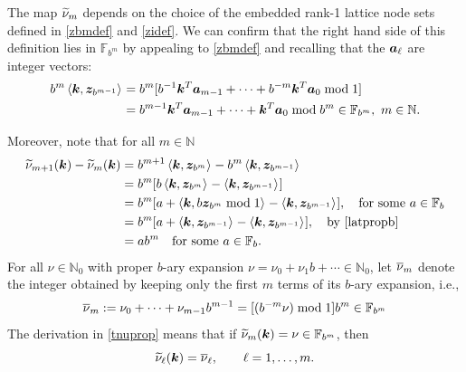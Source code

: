 \documentclass[graybox]{svmult}
\newcommand{\N}{\mathbb{N}} %
\newcommand{\F}{\mathbb{F}} %
\newcommand{\bsz}{\boldsymbol{z}}    %
\begin{document}
The map $\widetilde{\nu}_m$ depends on the choice of the embedded rank-1 lattice node sets defined in \eqref{zbmdef} and \eqref{zidef}.  We can confirm that the right hand side of this definition lies in $\F_{b^m}$ by appealing to  \eqref{zbmdef} and recalling that the $\boldsymbol{a}_\ell$ are integer vectors:
\begin{align*}
b^{m} \ip{\bsk}{\bsz_{b^{m-1}}} &= b^m[b^{-1} \bsk^T\bsa_{m-1} + \cdots + b^{-m}\bsk^T \bsa_{0} \bmod 1]\\
&= b^{m-1} \bsk^T\bsa_{m-1} + \cdots + \bsk^T \bsa_{0} \bmod b^m \in \F_{b^m}, \ m \in \N.
\end{align*}

Moreover, note that for all $m\in \N$
\begin{align}
\label{tnuprop}
\nonumber
\tnu_{m+1}(\bsk) - \tnu_{m}(\bsk) & = b^{m+1} \ip{\bsk}{\bsz_{b^{m}}} - b^{m} \ip{\bsk}{\bsz_{b^{m-1}}} \\
\nonumber
&=b^{m}[ b\ip{\bsk}{\bsz_{b^{m}}} - \ip{\bsk}{\bsz_{b^{m-1}}}]\\
\nonumber
&=b^{m}[ a + \ip{\bsk}{b\bsz_{b^{m}} \bmod 1}  - \ip{\bsk}{\bsz_{b^{m-1}}}], \quad \text{for some }a \in \F_b \\
\nonumber
&=b^{m}[ a + \ip{\bsk}{\bsz_{b^{m-1}}}  - \ip{\bsk}{\bsz_{b^{m-1}}}], \quad  \text{by \eqref{latpropb}} \\
&=a b^{m} \quad \text{for some }a \in \F_b.
\end{align}
For all $\nu\in \N_0$ with proper $b$-ary expansion $\nu= \nu_0 + \nu_1 b + \cdots \in \N_0$, let $\overline{\nu}_{m}$ denote the integer obtained by keeping only the first $m$ terms of its $b$-ary expansion, i.e., 
\begin{equation}
\label{onudef}
\onu_{m} := \nu_0 + \cdots + \nu_{m-1}b^{m-1} = [(b^{-m} \nu) \bmod 1] b^{m} \in \F_{b^{m}}
\end{equation}
The derivation in \eqref{tnuprop} means that if $\tnu_{m}(\bsk) = \nu \in \F_{b^m}$, then
\[
\widetilde{\nu}_\ell(\boldsymbol{k})=\overline{\nu}_{\ell}, \qquad \ell=1, \ldots, m.
\] 
\end{document}
